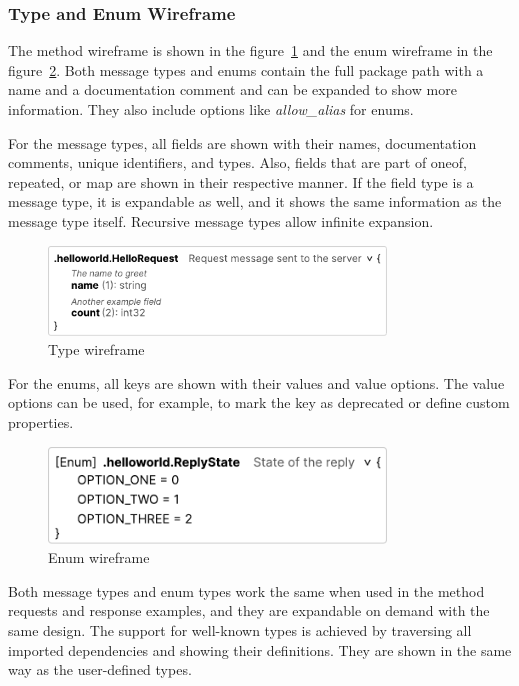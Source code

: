 \subsubsection{Type and Enum Wireframe}
The method wireframe is shown in the figure~\ref{fig:wireframe-type} and the enum wireframe in the figure~\ref{fig:wireframe-enum}.
Both message types and enums contain the full package path with a name and a documentation comment and can be expanded to show more information.
They also include options like \textit{allow\_alias} for enums.

For the message types, all fields are shown with their names, documentation comments, unique identifiers, and types.
Also, fields that are part of oneof, repeated, or map are shown in their respective manner.
If the field type is a message type, it is expandable as well, and it shows the same information as the message type itself.
Recursive message types allow infinite expansion.

\begin{figure}[hbt!]
    \centering
    \captionsetup{justification=centering}
    \includegraphics[width=0.8\textwidth]{images/design/wireframes/type}
    \caption{Type wireframe}
    \label{fig:wireframe-type}
\end{figure}


For the enums, all keys are shown with their values and value options.
The value options can be used, for example, to mark the key as deprecated or define custom properties.

\begin{figure}[hbt!]
    \centering
    \captionsetup{justification=centering}
    \includegraphics[width=0.8\textwidth]{images/design/wireframes/enum}
    \caption{Enum wireframe}
    \label{fig:wireframe-enum}
\end{figure}

Both message types and enum types work the same when used in the method requests and response examples, and they are expandable on demand with the same design.
The support for well-known types is achieved by traversing all imported dependencies and showing their definitions.
They are shown in the same way as the user-defined types.


